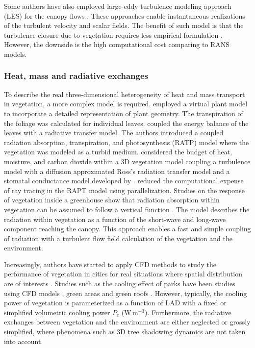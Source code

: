 Some authors have also employed large-eddy turbulence modeling approach (LES) for the canopy flows \citep{Maruyama2008, Lopes2013,Shaw1992,Moonen2013}. These approaches enable instantaneous realizations of the turbulent velocity and scalar fields. The benefit of such model is that the turbulence closure due to vegetation requires less empirical formulation  \citep{Hiraoka2011,Lopes2013}.  However, the downside is the high computational cost comparing to RANS models.

	
\subsubsection*{Heat, mass and radiative exchanges}

To describe the real three-dimensional heterogeneity of heat and mass transport in vegetation, a more complex model is required. \cite{Dauzat2001} employed a virtual plant model to incorporate a detailed representation of plant geometry. The transpiration of the foliage was calculated for individual leaves. \cite{Sinoquet2001} coupled the energy balance of the leaves with a radiative transfer model. The authors introduced a coupled radiation absorption, transpiration, and photosynthesis (RATP) model where the vegetation was modeled as a turbid medium. \cite{Hiraoka2005} considered the budget of heat, moisture, and carbon dioxide within a 3D vegetation model coupling a turbulence model with a diffusion approximated Ross’s radiation transfer model and a stomatal conductance model developed by \cite{Colla}. \cite{Bailey2014} reduced the computational expense of ray tracing in the RAPT model using parallelization. Studies on the response of vegetation inside a greenhouse show that radiation absorption within vegetation can be assumed to follow a vertical function \citep{Majdoubi2009,Kichah2012}. The model describes the radiation within vegetation as a function of the short-wave and long-wave component reaching the canopy. This approach enables a fast and simple coupling of radiation with a turbulent flow field calculation of the vegetation and the environment.
	
Increasingly, authors have started to apply CFD methods to study the performance of vegetation in cities for real situations where spatial distribution are of interests \citep{Gromke2014,Yoshida2006,Buccolieri2018}. Studies such as the cooling effect of parks have been studies using CFD models \citep{Toparlar2017a}, green areas \citep{Honjo1990,Ng2012} and green roofs \citep{Alexandri2008}. However, typically, the cooling power of vegetation is parameterized as a function of LAD with a fixed or simplified volumetric cooling power $P_c$ (W\,m$^{-3}$). Furthermore, the radiative exchanges between vegetation and the environment are either neglected or grossly simplified, where phenomena such as 3D tree shadowing dynamics are not taken into account.


